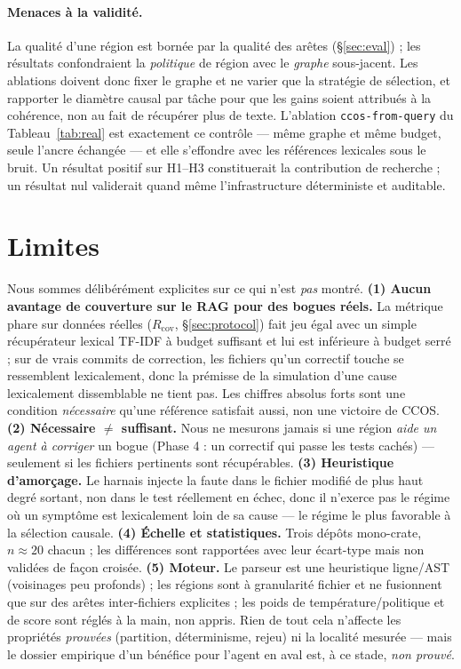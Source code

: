 \documentclass[11pt]{article}
\newcommand{\code}[1]{\texttt{#1}}
\begin{document}
\paragraph{Menaces à la validité.} La qualité d'une région est bornée par la qualité des
arêtes (\S\ref{sec:eval}) ; les résultats confondraient la \emph{politique} de région avec
le \emph{graphe} sous-jacent. Les ablations doivent donc fixer le graphe et ne varier que la
stratégie de sélection, et rapporter le diamètre causal par tâche pour que les gains soient
attribués à la cohérence, non au fait de récupérer plus de texte. L'ablation
\code{ccos-from-query} du Tableau~\ref{tab:real} est exactement ce contrôle --- même graphe
et même budget, seule l'ancre échangée --- et elle s'effondre avec les références lexicales
sous le bruit. Un résultat positif sur H1--H3 constituerait la contribution de recherche ;
un résultat nul validerait quand même l'infrastructure déterministe et auditable.

\section{Limites}

Nous sommes délibérément explicites sur ce qui n'est \emph{pas} montré.
\textbf{(1) Aucun avantage de couverture sur le RAG pour des bogues réels.} La métrique
phare sur données réelles ($R_{\mathrm{cov}}$, \S\ref{sec:protocol}) fait jeu égal avec un
simple récupérateur lexical TF-IDF à budget suffisant et lui est inférieure à budget serré ;
sur de vrais commits de correction, les fichiers qu'un correctif touche se ressemblent
lexicalement, donc la prémisse de la simulation d'une cause lexicalement dissemblable ne
tient pas. Les chiffres absolus forts sont une condition \emph{nécessaire} qu'une référence
satisfait aussi, non une victoire de CCOS.
\textbf{(2) Nécessaire $\neq$ suffisant.} Nous ne mesurons jamais si une région \emph{aide
un agent à corriger} un bogue (Phase 4 : un correctif qui passe les tests cachés) --- seulement
si les fichiers pertinents sont récupérables.
\textbf{(3) Heuristique d'amorçage.} Le harnais injecte la faute dans le fichier modifié de
plus haut degré sortant, non dans le test réellement en échec, donc il n'exerce pas le régime
où un symptôme est lexicalement loin de sa cause --- le régime le plus favorable à la
sélection causale.
\textbf{(4) Échelle et statistiques.} Trois dépôts mono-crate, $n\!\approx\!20$ chacun ; les
différences sont rapportées avec leur écart-type mais non validées de façon croisée.
\textbf{(5) Moteur.} Le parseur est une heuristique ligne/AST (voisinages peu profonds) ; les
régions sont à granularité fichier et ne fusionnent que sur des arêtes inter-fichiers
explicites ; les poids de température/politique et de score sont réglés à la main, non appris.
Rien de tout cela n'affecte les propriétés \emph{prouvées} (partition, déterminisme, rejeu)
ni la localité mesurée --- mais le dossier empirique d'un bénéfice pour l'agent en aval est, à
ce stade, \emph{non prouvé}.
\end{document}
